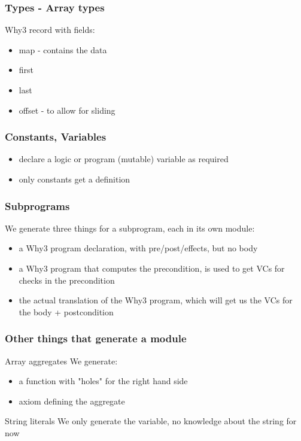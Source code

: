 \documentclass{beamer}
\newenvironment{specialframe}{%
  \begin{frame}[fragile,environment=specialframe]}{\end{frame}}
\begin{document}
\begin{specialframe}\frametitle{Types - Array types}
   \begin{block}{Why3 record with fields:}
      \begin{itemize}
         \item map - contains the data
         \item first
         \item last
         \item offset - to allow for sliding
      \end{itemize}
   \end{block}
\end{specialframe}

\begin{specialframe}\frametitle{Constants, Variables}
   \begin{itemize}
      \item declare a logic or program (mutable) variable as required
      \item only constants get a definition
   \end{itemize}
\end{specialframe}

\begin{specialframe}\frametitle{Subprograms}

We generate three things for a subprogram, each in its own module:
   \begin{itemize}
      \item a Why3 program declaration, with pre/post/effects, but no body
      \item a Why3 program that computes the precondition, is used to get VCs
for checks in the precondition
      \item the actual translation of the Why3 program, which will get us the
VCs for the body + postcondition
   \end{itemize}
\end{specialframe}

\begin{specialframe}\frametitle{Other things that generate a module}

   \begin{block}{Array aggregates}
      We generate:
   \begin{itemize}
      \item a function with "holes" for the right hand side
      \item axiom defining the aggregate
   \end{itemize}
   \end{block}
   \begin{block}{String literals}
      We only generate the variable, no knowledge about the string for now
   \end{block}
\end{specialframe}
\end{document}
